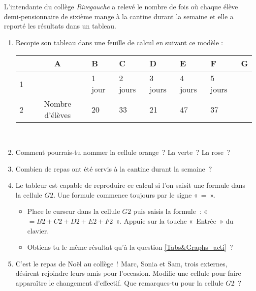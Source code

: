 \begin{activite}

\begin{partie}[À la cantine]
L'intendante du collège \emph{Rivegauche} a relevé le nombre de fois où chaque élève demi‑pensionnaire de sixième mange à la cantine durant la semaine et elle a reporté les résultats dans un tableau.
\begin{enumerate}
 \item Recopie son tableau dans une feuille de calcul en suivant ce modèle :
 \begin{center}
\begin{tabularx}{\linewidth}{|c|c|X|X|X|X|X|X|}
\hline \rowcolor{Gris1} & A & B & C & D & E & F & G \\
\hline \cellcolor{Gris1} 1 & & 1 jour & 2 jours & 3 jours & 4 jours & 5 jours & \\
\hline \cellcolor{Gris1} 2 & \cellcolor{G3} Nombre d'élèves & \cellcolor{J1} 20 & 33 & 21 & 47 & 37 & \cellcolor{B3} \\
\hline
\end{tabularx} \\
\end{center}
 \item Comment pourrais-tu nommer la cellule orange ? La verte ? La rose ?
 \item Combien de repas ont été servis à la cantine durant la semaine ? \label{Tabs&Graphs_acti}
 \item Le tableur est capable de reproduire ce calcul si l'on saisit une formule dans la cellule $G2$. Une formule commence toujours par le signe « = ». 
  \begin{itemize}
   \item Place le curseur dans la cellule $G2$ puis saisis la formule : « $= B2 + C2 + D2 + E2 + F2$ ». Appuie sur la touche « Entrée » du clavier. 
   \item Obtiens‑tu le même résultat qu'à la question \ref{Tabs&Graphs_acti} ?
   \end{itemize}
 \item C'est le repas de Noël au collège ! Marc, Sonia et Sam, trois externes, désirent rejoindre leurs amis pour l'occasion. Modifie une cellule pour faire apparaître le changement d'effectif. Que remarques‑tu pour la cellule $G2$ ?
 \end{enumerate}
\end{partie}


\end{activite}
